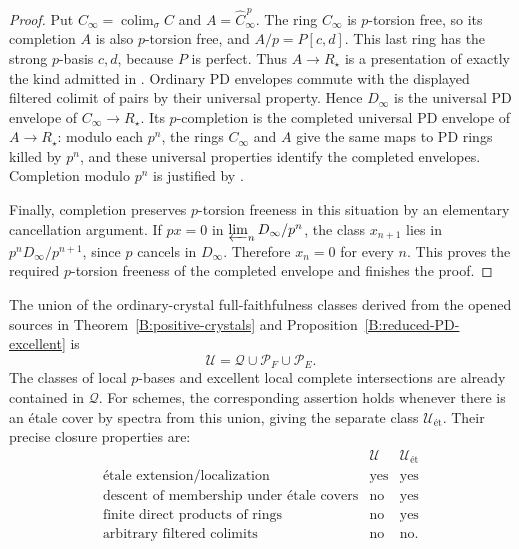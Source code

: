 \begin{proof}
Put $C_\infty=\operatorname{colim}_\sigma C$ and
$A=\widehat C_\infty^{\,p}$. The ring $C_\infty$ is
$p$-torsion free, so its completion $A$ is also $p$-torsion free,
and $A/p=P[c,d]$. This last ring has the strong $p$-basis
$c,d$, because $P$ is perfect. Thus $A\to R_\star$ is a
presentation of exactly the kind admitted in
\cite[Section 4, Proposition 4.2 and Definition 4.3]{B:LauDivided}.
Ordinary PD envelopes commute with the displayed filtered
colimit of pairs by their universal property. Hence $D_\infty$
is the universal PD envelope of $C_\infty\to R_\star$.
Its $p$-completion is the completed universal PD envelope of
$A\to R_\star$: modulo each $p^n$, the rings $C_\infty$ and $A$
give the same maps to PD rings killed by $p^n$, and these
universal properties identify the completed envelopes.
Completion modulo $p^n$ is justified by
\cite[Lemma 10.96.3, Tag 05GG]{B:StacksCompletion}.

Finally, completion preserves $p$-torsion freeness in this
situation by an elementary cancellation argument. If
$px=0$ in $\varprojlim_nD_\infty/p^n$, the class $x_{n+1}$ lies
in $p^nD_\infty/p^{n+1}$, since $p$ cancels in $D_\infty$.
Therefore $x_n=0$ for every $n$. This proves the required
$p$-torsion freeness of the completed envelope and finishes the
proof.
\end{proof}

\begin{corollary}
\label{B:largest-literature-class}
The union of the ordinary-crystal full-faithfulness classes
derived from the opened sources in
Theorem~\ref{B:positive-crystals} and
Proposition~\ref{B:reduced-PD-excellent} is
\[
 \mathcal U=\mathcal Q\cup\mathcal P_F\cup\mathcal P_E.
\]
The classes of local $p$-bases and excellent local complete
intersections are already contained in $\mathcal Q$.
For schemes, the corresponding assertion holds whenever there
is an \'etale cover by spectra from this union, giving the
separate class $\mathcal U_{\text{ét}}$.
Their precise closure properties are:
\[
\begin{array}{c|c|c}
 &\mathcal U&\mathcal U_{\text{ét}}\\ \hline
\text{\'etale extension/localization}&\text{yes}&\text{yes}\\
\text{descent of membership under \'etale covers}&\text{no}&\text{yes}\\
\text{finite direct products of rings}&\text{no}&\text{yes}\\
\text{arbitrary filtered colimits}&\text{no}&\text{no}.
\end{array}
\]
\end{corollary}

